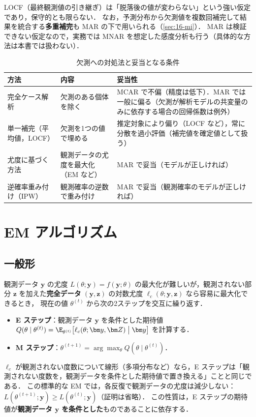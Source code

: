 \Youchui LOCF（最終観測値の引き継ぎ）は「脱落後の値が変わらない」という強い仮定であり，保守的とも限らない．
なお，予測分布から欠測値を複数回補完して結果を統合する\textbf{多重補完}も MAR の下で用いられる（\cref{sec:16-mi}）．
MAR は検証できない仮定なので，実務では MNAR を想定した感度分析も行う（具体的な方法は本書では扱わない）．

\begin{table}[htbp]
\centering\small
\caption{欠測への対処法と妥当となる条件}\label{tab:16-methods}
\begin{tabular}{@{}lL{48mm}L{52mm}@{}}
\toprule
方法 & 内容 & 妥当性\\
\midrule
完全ケース解析 & 欠測のある個体を除く & MCAR で不偏（精度は低下）．MAR では一般に偏る（欠測が解析モデルの共変量のみに依存する場合の回帰係数は例外）\\
単一補完（平均値，LOCF） & 欠測を1つの値で埋める & 推定対象により偏り（LOCF など），常に分散を過小評価（補完値を確定値として扱う）\\
尤度に基づく方法 & 観測データの尤度を最大化（EM など） & MAR で妥当（モデルが正しければ）\\
逆確率重み付け（IPW） & 観測確率の逆数で重み付け & MAR で妥当（観測確率のモデルが正しければ）\\
\bottomrule
\end{tabular}
\end{table}

\section{EM アルゴリズム}\label{sec:16-em}
\Hissu
\subsection{一般形}
観測データ $\bm y$ の尤度 $L(\theta;\bm y)=f(\bm y;\theta)$ の最大化が難しいが，観測されない部分 $\bm z$ を加えた\textbf{完全データ} $(\bm y,\bm z)$ の対数尤度 $\ell_c(\theta;\bm y,\bm z)$ なら容易に最大化できるとき，
現在の値 $\theta^{(t)}$ から次の2ステップを交互に繰り返す．
\begin{itemize}
\item \textbf{E ステップ}：観測データ $\bm y$ を条件とした期待値 $Q(\theta\mid\theta^{(t)})=\E_{\theta^{(t)}}\bigl[\ell_c(\theta;\bm y,\bm Z)\bigm|\bm y\bigr]$ を計算する．
\item \textbf{M ステップ}：$\theta^{(t+1)}=\arg\max_\theta Q(\theta\mid\theta^{(t)})$．
\end{itemize}
$\ell_c$ が観測されない度数について線形（多項分布など）なら，E ステップは「観測されない度数を，観測データを条件とした期待値で置き換える」ことと同じである．
この標準的な EM では，各反復で観測データの尤度は減少しない：$L(\theta^{(t+1)};\bm y)\ge L(\theta^{(t)};\bm y)$（証明は省略）．
この性質は，E ステップの期待値が\textbf{観測データ $\bm y$ を条件とした}ものであることに依存する．

